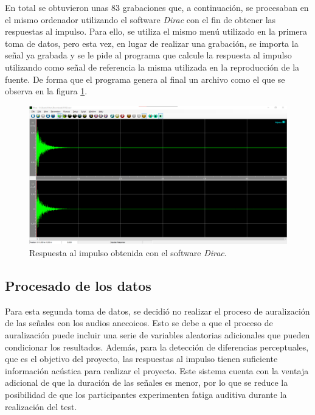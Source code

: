 \documentclass[11pt,a4paper]{book}
\begin{document}
            En total se obtuvieron unas 83 grabaciones que, a continuación, se procesaban en el mismo ordenador utilizando el software \textit{Dirac} con el fin de obtener las respuestas al impulso. Para ello, se utiliza el mismo menú utilizado en la primera toma de datos, pero esta vez, en lugar de realizar una grabación, se importa la señal ya grabada y se le pide al programa que calcule la respuesta al impulso utilizando como señal de referencia la misma utilizada en la reproducción de la fuente. De forma que el programa genera al final un archivo como el que se observa en la figura \ref{fig:IRDirac}.
            
            \begin{figure}[H]
                \includegraphics[scale=0.3]{../imagenes/IRDirac.png}
                \centering
                \caption{Respuesta al impulso obtenida con el software \textit{Dirac}.}
                \label{fig:IRDirac}
            \end{figure}
            
        \subsection{Procesado de los datos}
            Para esta segunda toma de datos, se decidió no realizar el proceso de auralización de las señales con los audios anecoicos. Esto se debe a que el proceso de auralización puede incluir una serie de variables aleatorias adicionales que pueden condicionar los resultados. Además, para la detección de diferencias perceptuales, que es el objetivo del proyecto, las respuestas al impulso tienen suficiente información acústica para realizar el proyecto. Este sistema cuenta con la ventaja adicional de que la duración de las señales es menor, por lo que se reduce la posibilidad de que los participantes experimenten fatiga auditiva durante la realización del test.
            
\end{document}
